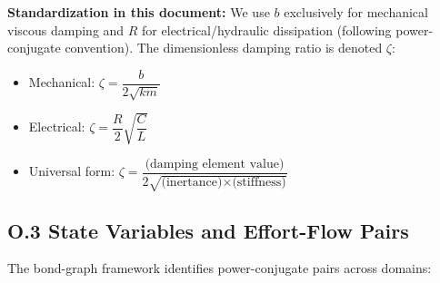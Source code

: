 \documentclass[
]{article}
\providecommand{\tightlist}{%
  \setlength{\itemsep}{0pt}\setlength{\parskip}{0pt}}
\begin{document}
\textbf{Standardization in this document:} We use \(b\) exclusively for
mechanical viscous damping and \(R\) for electrical/hydraulic
dissipation (following power-conjugate convention). The dimensionless
damping ratio is denoted \(\zeta\):

\begin{itemize}
\tightlist
\item
  Mechanical: \(\zeta = \dfrac{b}{2\sqrt{km}}\)
\item
  Electrical: \(\zeta = \dfrac{R}{2}\sqrt{\dfrac{C}{L}}\)
\item
  Universal form:
  \(\zeta = \dfrac{\text{(damping element value)}}{2\sqrt{\text{(inertance)} \times \text{(stiffness)}}}\)
\end{itemize}

\subsection{O.3 State Variables and Effort-Flow
Pairs}\label{o.3-state-variables-and-effort-flow-pairs}

The bond-graph framework identifies power-conjugate pairs across
domains:
\end{document}
